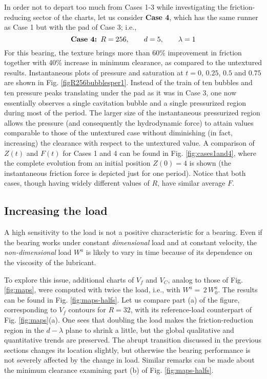 In order not to depart too much from Cases 1-3 while
investigating the friction-reducing sector of the charts,
let us consider {\bf Case 4}, which has the
same runner as Case 1 but with the pad of Case 3; i.e.,
$$
\mbox{\bf Case 4: } R=256,\qquad d=5, \qquad \lambda=1
$$
For this bearing, the texture brings more than 60\%
improvement in friction together with 40\% increase
in minimum clearance, as compared to the untextured results.
Instantaneous plots of pressure and saturation at
$t=0$, $0.25$, $0.5$ and $0.75$ are shown in Fig.
\ref{figR256bubblesper1}. Instead of the train of ten bubbles
and ten pressure peaks
translating under the pad as it was in Case 3, one now 
essentially observes a
single cavitation bubble and a single pressurized region
during most of the period. The larger size of the instantaneous
pressurized region allows the pressure (and consequently the hydrodynamic
force) to attain values comparable to those of the untextured
case without diminishing (in fact, increasing) the clearance
with respect to the untextured value. A comparison of $Z(t)$
and $F(t)$ for Cases 1 and 4 can be found in Fig. \ref{fig:cases1and4},
where the complete evolution from an initial position $Z(0)=4$
is shown (the instantaneous friction force is depicted just
for one period). Notice that both cases, though having widely
different values of $R$, have similar average $F$.

\subsection{Increasing the load}

A high sensitivity to the load is not a positive characteristic
for a bearing. Even if the bearing works under constant
{\em dimensional} load and at constant velocity, 
the {\em non-dimensional} load $W^a$
is likely to vary in time because of its dependence on the 
viscosity of the lubricant. 

To explore this issue, additional charts of $V_f$ and
$V_C$, analog to those of Fig. \ref{fig:maps}, were computed
with twice the load, i.e., with $W^a=\,2\,W^a_0$. The results
can be found in Fig. \ref{fig:maps-halfs}. Let us compare part
(a) of the figure, corresponding to $V_f$ contours
for $R=32$, with its reference-load counterpart
of Fig. \ref{fig:maps}(a). One sees that doubling the load 
makes the friction-reduction region in the $d-\lambda$ plane
to shrink a little, but the global qualitative and quantitative
trends are preserved. The abrupt transition discussed in the
previous sections changes its location slightly, but otherwise
the bearing performance is not severely affected by the change
in load. Similar remarks can be made about the minimum clearance
examining part (b) of Fig. \ref{fig:maps-halfs}.

